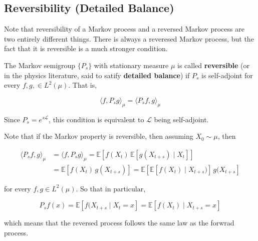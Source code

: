 \documentclass{article}
\begin{document}
  \subsection{Reversibility (Detailed Balance)}

    Note that reversibility of a Markov process and a reversed Markov process are two entirely different things. There is always a reveresed Markov process, but the fact that it is reversible is a much stronger condition. 

    \begin{definition}[Reversibility]
      The Markov semigroup $\{P_s\}$ with stationary measure $\mu$ is called \textbf{reversible} (or in the physics literature, said to satify \textbf{detailed balance}) if $P_s$ is self-adjoint for every $f, g, \in L^2 (\mu)$. That is, 

        \[\langle f, P_s g \rangle_\mu = \langle P_s f, g \rangle_\mu\]

      Since $P_s = e^{s \mathscr{L}}$, this condition is equivalent to $\mathscr{L}$ being self-adjoint.
    \end{definition}

    Note that if the Markov property is reversible, then assuming $X_0 \sim \mu$, then 

    \begin{align*}
      \langle P_s f, g \rangle_\mu & = \langle f, P_s g \rangle_\mu = \mathbb{E}[ f(X_t) \, \mathbb{E}[g(X_{t + s}) \mid X_t]] \\
      & = \mathbb{E}[ f(X_t) \, g(X_{t + s})] = \mathbb{E}[ \mathbb{E}[ f(X_t) \mid X_{t + s})] \, g(X_{t + s}] 
    \end{align*}

    for every $f, g \in L^2 (\mu)$. So that in particular, 

      \[P_s f (x) = \mathbb{E}[f(X_{t + s} \mid X_t = x] = \mathbb{E}[f(X_t) \mid X_{t + s} = x]\]

    which means that the reversed process follows the same law as the forwrad process. 
\end{document}
